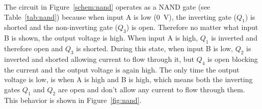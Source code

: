 The circuit in Figure~\ref{schem:nand} operates as a NAND gate (see Table~\ref{tab:nand}) because when input A is low (\SI{0}{V}), the inverting gate ($Q_1$) is shorted and the non-inverting gate ($Q_3$) is open.  Therefore no matter what input B is shown, the output voltage is high.  When input A is high, $Q_1$ is inverted and therefore open and $Q_3$ is shorted. During this state, when input B is low, $Q_2$ is inverted and shorted allowing current to flow through it, but $Q_4$ is open blocking the current and the output voltage is again high.  The only time the output voltage is low, is when A is high and B is high, which means both the inverting gates $Q_1$ and $Q_2$ are open and don't allow any current to flow through them.  This behavior is shown in Figure~\ref{fig:nand}.





